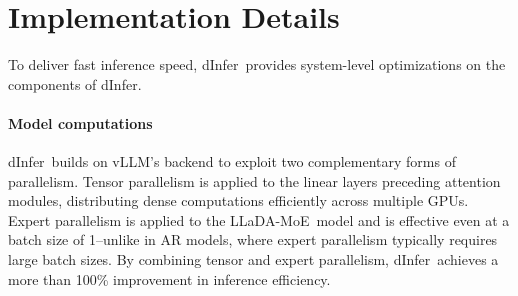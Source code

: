 \documentclass[]{antgroup}
\newcommand{\sys}{dInfer}
\newcommand{\lladamoe}{LLaDA-MoE}
\begin{document}

\section{Implementation Details}

To deliver fast inference speed, \sys~provides system-level optimizations on the components of \sys.


\paragraph{Model computations}


\sys~builds on vLLM’s backend to exploit two complementary forms of parallelism. Tensor parallelism is applied to the linear layers preceding attention modules, distributing dense computations efficiently across multiple GPUs. Expert parallelism is applied to the \lladamoe~model and is effective even at a batch size of 1--unlike in AR models, where expert parallelism typically requires large batch sizes. By combining tensor and expert parallelism, \sys~achieves a more than 100\% improvement in inference efficiency.

\end{document}
